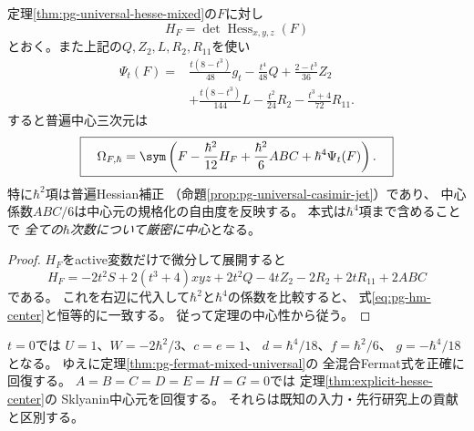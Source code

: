 \begin{corollary}[Hessianによるコンパクトな普遍式]
\label{cor:pg-hesse-hessian-form}
定理\ref{thm:pg-universal-hesse-mixed}の$F$に対し
\begin{equation}
 H_F=\det\operatorname{Hess}_{x,y,z}(F)
\end{equation}
とおく。また上記の$Q,Z_2,L,R_2,R_{11}$を使い
\begin{equation}
\begin{aligned}
 \Psi_t(F)={}&
 \frac{t(8-t^3)}{48}g_t
 -\frac{t^4}{48}Q
 +\frac{2-t^3}{36}Z_2\\
 &+\frac{t(8-t^3)}{144}L
 -\frac{t^2}{24}R_2
 -\frac{t^3+4}{72}R_{11}.
\end{aligned}
\end{equation}
すると普遍中心三次元は
\begin{equation}
 \boxed{\quad
 \Omega_{F,\hbar}
 =\sym\left(
 F-\frac{\hbar^2}{12}H_F
 +\frac{\hbar^2}{6}ABC
 +\hbar^4\Psi_t(F)
 \right).
 \quad}
 \label{eq:pg-hesse-hessian-closed}
\end{equation}
特に$\hbar^2$項は普遍Hessian補正
（命題\ref{prop:pg-universal-casimir-jet}）であり、
中心係数$ABC/6$は中心元の規格化の自由度を反映する。
本式は$\hbar^4$項まで含めることで
\emph{全ての$\hbar$次数について厳密に中心}となる。
\end{corollary}
\begin{proof}
$H_F$をactive変数だけで微分して展開すると
\begin{equation}
 H_F=-2t^2S+2(t^3+4)xyz+
 2t^2Q-4tZ_2-2R_2+2tR_{11}+2ABC
\end{equation}
である。
これを右辺に代入して$\hbar^2$と$\hbar^4$の係数を比較すると、
式\eqref{eq:pg-hm-center}と恒等的に一致する。
従って定理の中心性から従う。
\end{proof}

\begin{remark}[既存の中心元との整合性]
$t=0$では
$U=1$、$W=-2\hbar^2/3$、$c=e=1$、
$d=\hbar^4/18$、$f=\hbar^2/6$、
$g=-\hbar^4/18$となる。
ゆえに定理\ref{thm:pg-fermat-mixed-universal}の
全混合Fermat式を正確に回復する。
$A=B=C=D=E=H=G=0$では
定理\ref{thm:explicit-hesse-center}の
Sklyanin中心元を回復する。
それらは既知の入力・先行研究上の貢献と区別する。
\end{remark}

